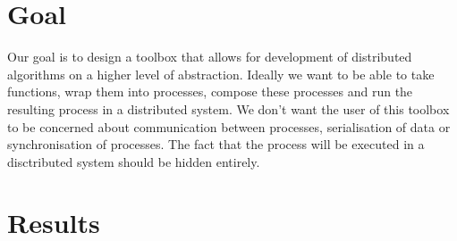 \section{Goal}
Our goal is to design a toolbox that allows for development of distributed algorithms on a higher level of abstraction. Ideally we want to be able to take functions, wrap them into processes, compose these processes and run the resulting process in a distributed system. We don't want the user of this toolbox to be concerned about communication between processes, serialisation of data or synchronisation of processes. The fact that the process will be executed in a disctributed system should be hidden entirely.



\section{Results}